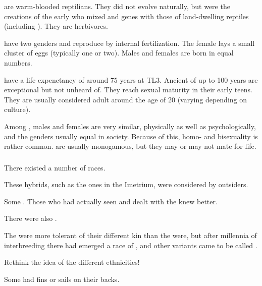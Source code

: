 \Scathae{} are warm-blooded reptilians. They did not evolve naturally, but were the creations of the early \dragonlords{} who mixed \dragon{} and \naga{} genes with those of land-dwelling reptiles (including \nycans{}). They are herbivores. 

\Scathae{} have two genders and reproduce by internal fertilization. The female lays a small cluster of eggs (typically one or two). Males and females are born in equal numbers. 

\Scathae{} have a life expenctancy of around 75 years at TL3. Ancient \scathae{} of up to 100 years are exceptional but not unheard of. They reach sexual maturity in their early teens. They are usually considered adult around the age of 20 (varying depending on culture). 

Among \scathae{}, males and females are very similar, physically as well as psychologically, and the genders usually equal in society. Because of this, homo- and bisexuality is rather common. \Scathae{} are usually monogamous, but they may or may not mate for life.  





\subsubsection{\Demiscathae}
There existed a number of \quo{\demiscatha} races. 

\begin{gloss}
    These hybrids, such as the ones in the Imetrium, were considered \demiscathae by outsiders. 
  
    Some .
    Those who had actually seen and dealt with the \nagae knew better.
\end{gloss}

There were also .

The \scathae were more tolerant of their different kin than the \humans were, but after millennia of interbreeding there had emerged a race of  \scathae, and other variants came to be called \quo{\demiscathae}. 

Rethink the idea of the different \scatha ethnicities!

Some \scathae had fins or sails on their backs. 





